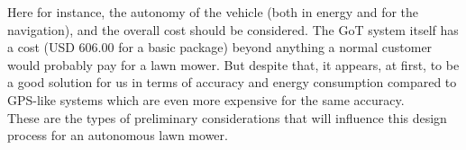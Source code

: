 \noindent
Here for instance, the autonomy of the vehicle (both in energy and for the navigation), and the overall cost should be considered. The GoT system itself has a cost (USD 606.00 for a basic package) beyond anything a normal customer would probably pay for a lawn mower. But despite that, it appears, at first, to be a good solution for us in terms of accuracy and energy consumption compared to GPS-like systems which are even more expensive for the same accuracy.  \\

\noindent
These are the types of preliminary considerations that will influence this design process for an autonomous lawn mower.